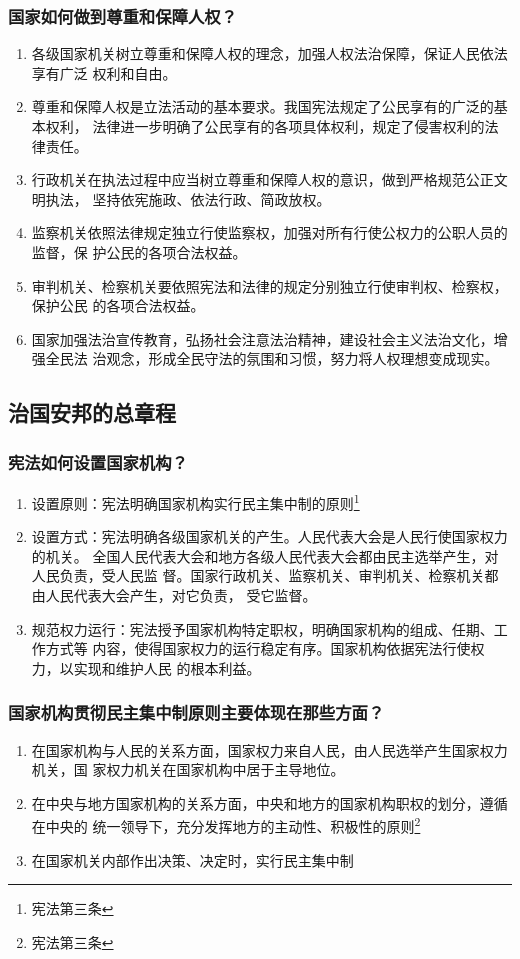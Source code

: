 \documentclass[11pt]{article}
\begin{document}
\subsubsection{国家如何做到尊重和保障人权？}
\label{sec:orgfafea0d}
\begin{enumerate}
\item 各级国家机关树立尊重和保障人权的理念，加强人权法治保障，保证人民依法享有广泛
权利和自由。
\item 尊重和保障人权是立法活动的基本要求。我国宪法规定了公民享有的广泛的基本权利，
法律进一步明确了公民享有的各项具体权利，规定了侵害权利的法律责任。
\item 行政机关在执法过程中应当树立尊重和保障人权的意识，做到严格规范公正文明执法，
坚持依宪施政、依法行政、简政放权。
\item 监察机关依照法律规定独立行使监察权，加强对所有行使公权力的公职人员的监督，保
护公民的各项合法权益。
\item 审判机关、检察机关要依照宪法和法律的规定分别独立行使审判权、检察权，保护公民
的各项合法权益。
\item 国家加强法治宣传教育，弘扬社会注意法治精神，建设社会主义法治文化，增强全民法
治观念，形成全民守法的氛围和习惯，努力将人权理想变成现实。
\end{enumerate}
\subsection{治国安邦的总章程}
\label{sec:orgbe456bc}
\subsubsection{宪法如何设置国家机构？}
\label{sec:org3dea87a}
\begin{enumerate}
\item 设置原则：宪法明确国家机构实行民主集中制的原则\footnote{宪法第三条}
\item 设置方式：宪法明确各级国家机关的产生。人民代表大会是人民行使国家权力的机关。
全国人民代表大会和地方各级人民代表大会都由民主选举产生，对人民负责，受人民监
督。国家行政机关、监察机关、审判机关、检察机关都由人民代表大会产生，对它负责，
受它监督。
\item 规范权力运行：宪法授予国家机构特定职权，明确国家机构的组成、任期、工作方式等
内容，使得国家权力的运行稳定有序。国家机构依据宪法行使权力，以实现和维护人民
的根本利益。
\end{enumerate}
\subsubsection{国家机构贯彻民主集中制原则主要体现在那些方面？}
\label{sec:org7d3ae2f}
\begin{enumerate}
\item 在国家机构与人民的关系方面，国家权力来自人民，由人民选举产生国家权力机关，国
家权力机关在国家机构中居于主导地位。
\item 在中央与地方国家机构的关系方面，中央和地方的国家机构职权的划分，遵循在中央的
统一领导下，充分发挥地方的主动性、积极性的原则\footnote{宪法第三条}
\item 在国家机关内部作出决策、决定时，实行民主集中制
\end{enumerate}
\end{document}
